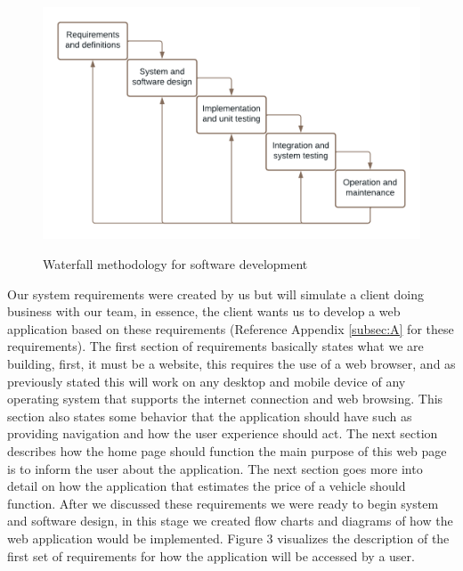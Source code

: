 \documentclass[12pt]{article}
\begin{document}
\begin{figure}[H]
\caption{Waterfall methodology for software development}
\centering
\includegraphics[scale=.45]{figures/Waterfall Methodology.png}\\
\end{figure}
\noindent Our system requirements were created by us but will simulate a client doing business with our team, in essence, the client wants us to develop a web application based on these requirements (Reference Appendix \ref{subsec:A} for these requirements). The first section of requirements basically states what we are building, first, it must be a website, this requires the use of a web browser, and as previously stated this will work on any desktop and mobile device of any operating system that supports the internet connection and web browsing. This section also states some behavior that the application should have such as providing navigation and how the user experience should act. The next section describes how the home page should function the main purpose of this web page is to inform the user about the application. The next section goes more into detail on how the application that estimates the price of a vehicle should function. After we discussed these requirements we were ready to begin system and software design, in this stage we created flow charts and diagrams of how the web application would be implemented. Figure 3 visualizes the description of the first set of requirements for how the application will be accessed by a user. 
\end{document}
